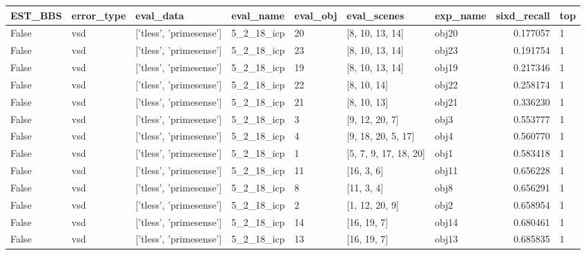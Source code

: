 \documentclass[a4paper,table]{article}
\begin{document}
\begin{adjustbox}{max width=\textwidth}\begin{tabular}{lllllllrl}
\toprule
 EST\_BBS & error\_type &                eval\_data &   eval\_name & eval\_obj &            eval\_scenes & exp\_name &  sixd\_recall & top \\
\midrule
   False &        vsd &  ['tless', 'primesense'] &  5\_2\_18\_icp &       20 &        [8, 10, 13, 14] &    obj20 &     0.177057 &   1 \\
   False &        vsd &  ['tless', 'primesense'] &  5\_2\_18\_icp &       23 &        [8, 10, 13, 14] &    obj23 &     0.191754 &   1 \\
   False &        vsd &  ['tless', 'primesense'] &  5\_2\_18\_icp &       19 &        [8, 10, 13, 14] &    obj19 &     0.217346 &   1 \\
   False &        vsd &  ['tless', 'primesense'] &  5\_2\_18\_icp &       22 &            [8, 10, 14] &    obj22 &     0.258174 &   1 \\
   False &        vsd &  ['tless', 'primesense'] &  5\_2\_18\_icp &       21 &            [8, 10, 13] &    obj21 &     0.336230 &   1 \\
   False &        vsd &  ['tless', 'primesense'] &  5\_2\_18\_icp &        3 &         [9, 12, 20, 7] &     obj3 &     0.553777 &   1 \\
   False &        vsd &  ['tless', 'primesense'] &  5\_2\_18\_icp &        4 &     [9, 18, 20, 5, 17] &     obj4 &     0.560770 &   1 \\
   False &        vsd &  ['tless', 'primesense'] &  5\_2\_18\_icp &        1 &  [5, 7, 9, 17, 18, 20] &     obj1 &     0.583418 &   1 \\
   False &        vsd &  ['tless', 'primesense'] &  5\_2\_18\_icp &       11 &             [16, 3, 6] &    obj11 &     0.656228 &   1 \\
   False &        vsd &  ['tless', 'primesense'] &  5\_2\_18\_icp &        8 &             [11, 3, 4] &     obj8 &     0.656291 &   1 \\
   False &        vsd &  ['tless', 'primesense'] &  5\_2\_18\_icp &        2 &         [1, 12, 20, 9] &     obj2 &     0.658954 &   1 \\
   False &        vsd &  ['tless', 'primesense'] &  5\_2\_18\_icp &       14 &            [16, 19, 7] &    obj14 &     0.680461 &   1 \\
   False &        vsd &  ['tless', 'primesense'] &  5\_2\_18\_icp &       13 &            [16, 19, 7] &    obj13 &     0.685835 &   1 \\

\end{tabular}
\end{adjustbox}
\end{document}
